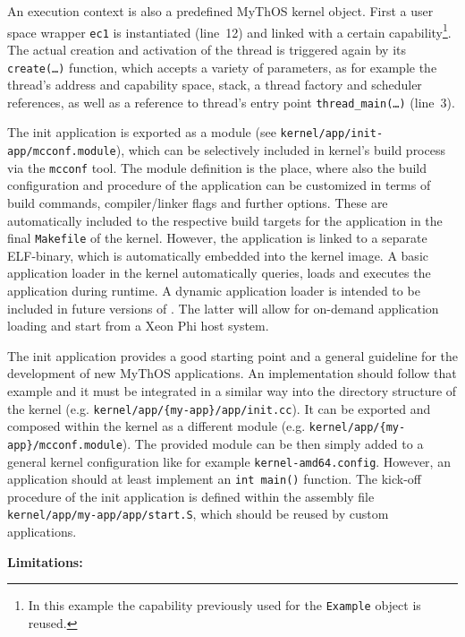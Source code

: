 An execution context is also a predefined MyThOS kernel object.
First a user space wrapper \texttt{ec1} is instantiated (line~12) and linked
with a certain capability\footnote{In this example the capability previously
used for the \texttt{Example} object is reused.}.
The actual creation and activation of the thread is triggered again by its
\texttt{create(\ldots)} function, which accepts a variety of parameters, as for
example the thread's address and capability space, stack, a thread factory and
scheduler references, as well as a reference to thread's entry point
\texttt{thread\_main(\ldots)} (line~3).

The init application is exported as a module (see
\texttt{kernel/app/init-app/mcconf.module}), which can be selectively included
in kernel's build process via the \texttt{mcconf} tool. The module definition is
the place, where also the build configuration and procedure of the application
can be customized in terms of build commands, compiler/linker flags and further
options. These are automatically included to the respective build targets for
the application in the final \texttt{Makefile} of the kernel. However, the
application is linked to a separate ELF-binary, which is automatically embedded
into the kernel image. A basic application loader in the kernel automatically
queries, loads and executes the application during runtime.
A dynamic application loader is intended to be included in future versions of
\mythos. The latter will allow for on-demand application loading and start from
a Xeon Phi host system.

The init application provides a good starting point and a general guideline for
the development of new MyThOS applications. An implementation should follow that
example and it must be integrated in a similar way into the directory structure
of the kernel (e.g. \texttt{kernel/app/\{my-app\}/app/init.cc}). It can be
exported and composed within the kernel as a different module (e.g.
\texttt{kernel/app/\{my-app\}/mcconf.module}). The provided module can be then
simply added to a general kernel configuration like for example
\texttt{kernel-amd64.config}. However, an application should at least implement
an \texttt{int main()} function. The kick-off procedure of the init application
is defined within the assembly file \texttt{kernel/app/{my-app}/app/start.S},
which should be reused by custom applications.

\noindent\textbf{Limitations:}

